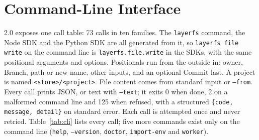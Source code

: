 \section{Command-Line Interface}
\label{app:cli}

\sys{} 2.0 exposes one call table: 73 calls in ten families. The \texttt{layerfs}
command, the Node SDK and the Python SDK are all generated from it, so
\texttt{layerfs file write} on the command line is \texttt{layerfs.file.write} in the
SDKs, with the same positional arguments and options. Positionals run from the
outside in: owner, Branch, path or new name, other inputs, and an optional Commit
last. A project is named \texttt{<store>/<project>}. File content comes from standard
input or \texttt{--from}. Every call prints JSON, or text with \texttt{--text}; it exits
0 when done, 2 on a malformed command line and 125 when refused, with a structured
\texttt{\{code, message, detail\}} on standard error. Each call is attempted once and
never retried. Table~\ref{tab:cli} lists every call; five more commands exist only on
the command line (\texttt{help}, \texttt{--version}, \texttt{doctor},
\texttt{import-env} and \texttt{worker}).

